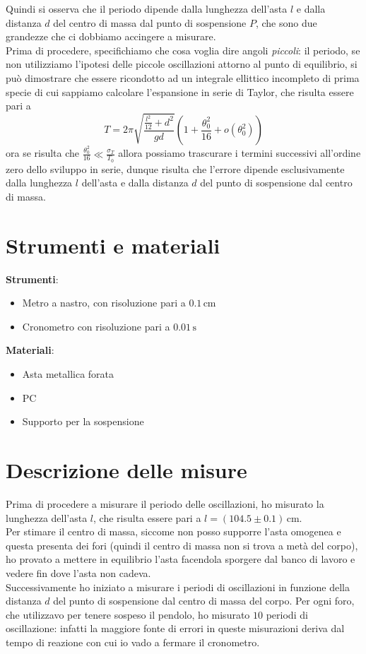 \documentclass{article}
\begin{document}
	Quindi si osserva che il periodo dipende dalla lunghezza dell'asta $l$ e dalla distanza $d$ del centro di massa dal punto di sospensione $P$, che sono due grandezze che ci dobbiamo accingere a misurare. \\
	Prima di procedere, specifichiamo che cosa voglia dire angoli \emph{piccoli}: il periodo, se non utilizziamo l'ipotesi delle piccole oscillazioni attorno al punto di equilibrio, si può dimostrare che essere ricondotto ad un integrale ellittico incompleto di prima specie di cui sappiamo calcolare l'espansione in serie di Taylor, che risulta essere pari a
	\begin{equation}
		T = 2 \pi \sqrt{\frac{\frac{l^2}{12} + d^2}{gd}} \left( 1 + \frac{\theta_0^2}{16} + o(\theta_0^2) \right)
	\end{equation}
	ora se risulta che $\frac{\theta_0^2}{16} \ll \frac{\sigma_T}{T_0}$ allora possiamo trascurare i termini successivi all'ordine zero dello sviluppo in serie, dunque risulta che l'errore dipende esclusivamente dalla lunghezza $l$ dell'asta e dalla distanza $d$ del punto di sospensione dal centro di massa. 
\section{Strumenti e materiali}
	\textbf{Strumenti}:	
	\begin{itemize}
		\item Metro a nastro, con risoluzione pari a $0.1 \, \si{\centi\meter}$
		\item Cronometro con risoluzione pari a $0.01 \, \si{\second}$
	\end{itemize}
	\textbf{Materiali}:
	\begin{itemize}
		\item Asta metallica forata
		\item PC
		\item Supporto per la sospensione
	\end{itemize}
\section{Descrizione delle misure}
Prima di procedere a misurare il periodo delle oscillazioni, ho misurato la lunghezza dell'asta $l$, che risulta essere pari a $l = (104.5 \pm 0.1) \, \si{\centi\meter}$. \\
Per stimare il centro di massa, siccome non posso supporre l'asta omogenea e questa presenta dei fori (quindi il centro di massa non si trova a metà del corpo), ho provato a mettere in equilibrio l'asta facendola sporgere dal banco di lavoro e vedere fin dove l'asta non cadeva. \\
Successivamente ho iniziato a misurare i periodi di oscillazioni in funzione della distanza $d$ del punto di sospensione dal centro di massa del corpo. Per ogni foro, che utilizzavo per tenere sospeso il pendolo, ho misurato $10$ periodi di oscillazione: infatti la maggiore fonte di errori in queste misurazioni deriva dal tempo di reazione con cui io vado a fermare il cronometro. \\
\end{document}
